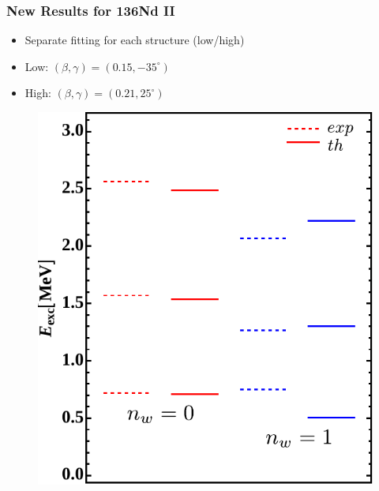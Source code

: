 \documentclass{beamer}
\begin{document}
\begin{frame}
  \frametitle{New Results for 136Nd II}
\begin{itemize}
  \item Separate fitting for each structure (low/high)
  \item Low: $(\beta,\gamma)=(0.15,-35^\circ)$
  \item High: $(\beta,\gamma)=(0.21,25^\circ)$
\end{itemize}
  \begin{figure}
    \centering
    \includegraphics[scale=0.458]{Figs/136Nd-excitation-lower-edited.pdf}

\end{figure}
\end{frame}
\end{document}
